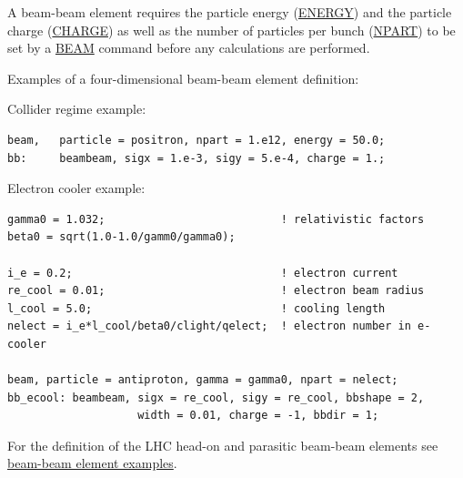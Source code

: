 A beam-beam element requires the particle energy
(\href{beam.html#energy}{ENERGY})
and the particle charge
(\href{beam.html#charge}{CHARGE})
as well as the number of particles per bunch 
(\href{beam.html#npart}{NPART})
to be set by a \href{beam.html}{BEAM} command
before any calculations are performed.


Examples of a four-dimensional beam-beam element definition:
 
Collider regime example:
\begin{verbatim}
beam,   particle = positron, npart = 1.e12, energy = 50.0;
bb:     beambeam, sigx = 1.e-3, sigy = 5.e-4, charge = 1.;
\end{verbatim}


Electron cooler example: 
\begin{verbatim}
gamma0 = 1.032;                           ! relativistic factors
beta0 = sqrt(1.0-1.0/gamm0/gamma0);

i_e = 0.2;                                ! electron current
re_cool = 0.01;                           ! electron beam radius
l_cool = 5.0;                             ! cooling length
nelect = i_e*l_cool/beta0/clight/qelect;  ! electron number in e-cooler

beam, particle = antiproton, gamma = gamma0, npart = nelect; 
bb_ecool: beambeam, sigx = re_cool, sigy = re_cool, bbshape = 2, 
                    width = 0.01, charge = -1, bbdir = 1;
\end{verbatim}

For the definition of the LHC head-on and parasitic beam-beam elements see 
 \href{../control/foot.html#macro}{beam-beam element examples}.

